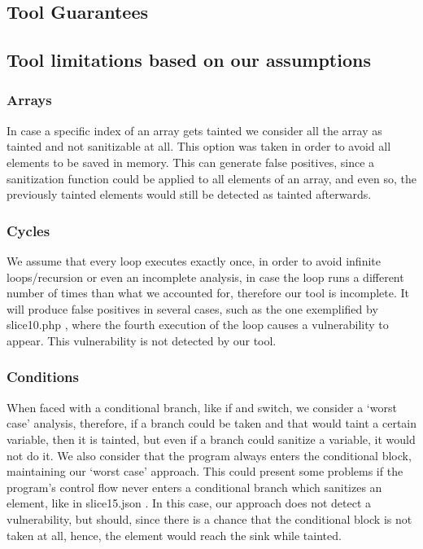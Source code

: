 \documentclass[10pt,onecolumn,a4paper]{article}
\begin{document}
	\subsection{Tool Guarantees}

	\subsection{Tool limitations based on our assumptions}
\subsubsection{Arrays}
\hspace{3.5mm} In case a specific index of an array gets tainted we consider all the array as tainted and not sanitizable at all. This option was taken in order to avoid all elements to be saved in memory. This can generate false positives, since a sanitization function could be applied to all elements of an array, and even so, the previously tainted elements would still be detected as tainted afterwards.

\subsubsection{Cycles}
\hspace{3.5mm} We assume that every loop executes exactly once, in order to avoid infinite loops/recursion or even an incomplete analysis, in case the loop runs a different number of times than what we accounted for, therefore our tool is incomplete. 
It will produce false positives in several cases, such as the one exemplified by slice10.php \cite{SLICES}, where the fourth execution of the loop causes a vulnerability to appear. This vulnerability is not
detected by our tool. 

\subsubsection{Conditions}
\hspace{3.5mm} When faced with a conditional branch, like if and switch, we consider a ‘worst case’ analysis, therefore, if a branch could be taken and that would taint a certain variable, then it is tainted, but even if a branch could sanitize a variable, it would not do it. We also consider that the program always enters the conditional block, maintaining our ‘worst case’ approach. This could present some problems if the program's control flow never enters a conditional branch which sanitizes an element, like in slice15.json \cite{CUSTOMSLICES}. In this case, our approach does not detect a vulnerability, but should, since there is a chance that the conditional block is not taken at all, hence, the element would reach the sink while tainted.
\end{document}
